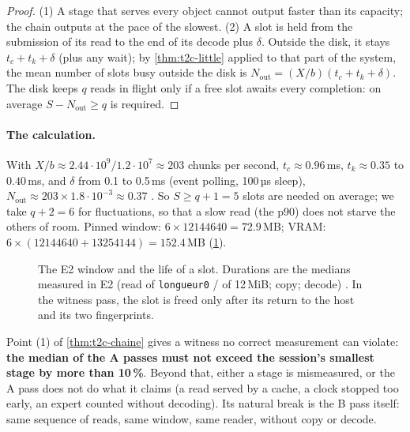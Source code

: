 \begin{proof}
(1) A stage that serves every object cannot output faster than its capacity; the chain outputs at the pace of the slowest. (2) A slot is held from the submission of its read to the end of its decode plus $\delta$. Outside the disk, it stays $t_c + t_k + \delta$ (plus any wait); by \cref{thm:t2c-little} applied to that part of the system, the mean number of slots busy outside the disk is $N_{\mathrm{out}} = (X/b)(t_c + t_k + \delta)$. The disk keeps $q$ reads in flight only if a free slot awaits every completion: on average $S - N_{\mathrm{out}} \ge q$ is required.
\end{proof}

\paragraph{The calculation.} With $X/b \approx 2.44\cdot10^{9} / 1.2\cdot10^{7} \approx 203$ chunks per second, $t_c \approx 0.96$\,ms, $t_k \approx 0.35$ to $0.40$\,ms, and $\delta$ from 0.1 to 0.5\,ms (event polling, 100\,µs sleep), $N_{\mathrm{out}} \approx 203 \times 1.8\cdot10^{-3} \approx 0.37$ \calc. So $S \ge q + 1 = 5$ slots are needed on average; we take $q + 2 = 6$ for fluctuations, so that a slow read (the p90) does not starve the others of room. Pinned window: $6 \times \num{12144640} = 72.9$\,MB; VRAM: $6 \times (\num{12144640} + \num{13254144}) = 152.4$\,MB (\cref{fig:t2c-fenetre}).

\begin{figure}[ht]
\centering
\SchemaChmFenetre
\caption[The E2 window and the life of a slot]{The E2 window and the life of a slot. Durations are the medians measured in E2 (read of \texttt{longueur0} / of 12\,MiB; copy; decode) \mes. In the witness pass, the slot is freed only after its return to the host and its two fingerprints.}
\label{fig:t2c-fenetre}
\end{figure}

Point (1) of \cref{thm:t2c-chaine} gives a witness no correct measurement can violate: \textbf{the median of the A passes must not exceed the session's smallest stage by more than 10\,\%}. Beyond that, either a stage is mismeasured, or the A pass does not do what it claims (a read served by a cache, a clock stopped too early, an expert counted without decoding). Its natural break is the B pass itself: same sequence of reads, same window, same reader, without copy or decode.

